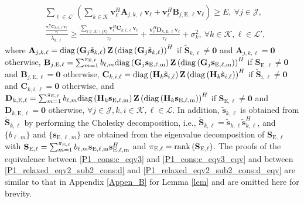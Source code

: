 \documentclass[12pt,draftclsnofoot, onecolumn]{IEEEtran}
\theoremstyle{plain}
\begin{document}
\begin{sloppypar}
\begin{align}
& \sum_{\ell\in\mathcal L'}\left(\sum_{k\in\mathcal K}\mathbf v_\ell^H\mathbf A_{j,k,\ell}\mathbf v_\ell + \mathbf v_\ell^H\mathbf B_{j,\mathrm E,\ell}\mathbf v_\ell\right) \geq E, \ \forall j\in\mathcal J, \label{P1_cons:c_eqv3_eqv}\\
& \frac{\frac{\mathbf v_\ell^H\mathbf C_{k,k,\ell}\mathbf v_\ell}{\tau_\ell}}{\lambda_{k,\ell}} \geq \frac{\sum_{i\in \mathcal K\backslash\{k\}}\mathbf v_\ell^H\mathbf C_{k,i,\ell} \mathbf v_\ell}{\tau_\ell} + \frac{\mathbf v_\ell^H\mathbf D_{k,\mathrm E,\ell}\mathbf v_\ell}{\tau_\ell} + \sigma_k^2, \ \forall k\in\mathcal K, \ell\in\mathcal L', \label{P1_relaxed_eqv2_sub2_cons:d_eqv}
\end{align}%
where $\mathbf A_{j,k,\ell} = {\rm diag}\left(\mathbf G_j\tilde{\mathbf s}_{k,\ell}\right)\mathbf Z\left({\rm diag}\left(\mathbf G_j\tilde{\mathbf s}_{k,\ell}\right)\right)^H$ if $\tilde{\mathbf S}_{k,\ell} \neq \mathbf 0$ and $\mathbf A_{j,k,\ell} = \mathbf 0$ otherwise, $\mathbf B_{j,\mathrm E,\ell} = \sum_{m=1}^{\pi_{\rm E,\ell}}b_{\ell,m}{\rm diag}\left(\mathbf G_j\mathbf s_{\rm E,\ell,m}\right)\mathbf Z\left( {\rm diag}\left(\mathbf G_j\mathbf s_{\rm E,\ell,m}\right)\right)^H$ if ${\mathbf S}_{\mathrm E,\ell} \neq \mathbf 0$ and $\mathbf B_{j,\mathrm E,\ell} = \mathbf 0$ otherwise, $\mathbf C_{k,i,\ell} = {\rm diag}\left(\mathbf H_k\tilde{\mathbf s}_{i,\ell}\right)\mathbf Z\left({\rm diag}\left(\mathbf H_k\tilde{\mathbf s}_{i,\ell}\right)\right)^H$ if $\tilde{\mathbf S}_{i,\ell} \neq \mathbf 0$ and $\mathbf C_{k,i,\ell} = \mathbf 0$ otherwise, and $\mathbf D_{k,\mathrm E,\ell} = \sum_{m=1}^{\pi_{\rm E,\ell}}b_{\ell,m}{\rm diag}\left(\mathbf H_k\mathbf s_{\rm E,\ell,m}\right)\mathbf Z\left( {\rm diag}\left(\mathbf H_k\mathbf s_{\rm E,\ell,m}\right)\right)^H$ if $\mathbf S_{\mathrm E,\ell} \neq \mathbf 0$ and $\mathbf D_{k,\mathrm E,\ell} = \mathbf 0$ otherwise, $\forall j\in\mathcal J, k,i\in\mathcal K, \ell\in\mathcal L$. In addition, $\tilde{\mathbf s}_{k,\ell}$ is obtained from $\tilde{\mathbf S}_{k,\ell}$ by performing the Cholesky
decomposition, i.e., $\tilde{\mathbf S}_{k,\ell} = \tilde{\mathbf s}_{k,\ell}\tilde{\mathbf s}_{k,\ell}^H$, and $\{b_{\ell,m}\}$ and $\{\mathbf s_{\mathrm E,\ell,m}\}$ are obtained from the eigenvalue
decomposition of $\mathbf S_{\mathrm E,\ell}$ with $\mathbf S_{\rm E,\ell} = \sum_{m=1}^{\pi_{\rm E,\ell}}b_{\ell,m}\mathbf s_{\rm E,\ell,m}\mathbf s_{\rm E,\ell,m}^H$ and $\pi_{\mathrm E,\ell} = {\rm rank}\left(\mathbf S_{\mathrm E,\ell}\right)$. The proofs of the equivalence between \eqref{P1_cons:c_eqv3} and \eqref{P1_cons:c_eqv3_eqv} and between \eqref{P1_relaxed_eqv2_sub2_cons:d} and \eqref{P1_relaxed_eqv2_sub2_cons:d_eqv} are similar to that in Appendix \ref{Appen_B} for Lemma \ref{lem} and are omitted here for brevity.


\end{sloppypar}
\end{document}
